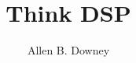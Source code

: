 \documentclass[12pt]{book}
\title{Think DSP}
\author{Allen B. Downey}
\newif\ifplastex
\begin{document}
\frontmatter

\ifplastex

\else
\fi

\ifplastex
    \usepackage{localdef}
    \maketitle

\else

  {\topsep}%
  {\topsep}%
  {}%
  {}%
  {\bfseries}%
  {}%
  { }%
  {}%

\theoremstyle{exercise}
\newtheorem{exercise}{Exercise}[chapter]


\end{document}
